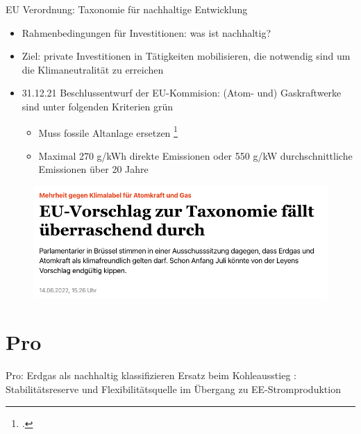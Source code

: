 \documentclass[10pt]{beamer}
\begin{document}
\begin{frame}{EU Verordnung: Taxonomie für nachhaltige Entwicklung}
  \small
  \begin{itemize}
    \item Rahmenbedingungen für Investitionen: was ist nachhaltig? 
    \item Ziel: private Investitionen in Tätigkeiten mobilisieren, die notwendig sind um die Klimaneutralität zu erreichen 
    \item 31.12.21 Beschlussentwurf der EU-Kommision: 
      (Atom- und) Gaskraftwerke sind unter folgenden Kriterien grün 
    \begin{itemize}
      \item Muss fossile Altanlage ersetzen \footcite{taz-taxonomie}
      \item Maximal 270 g/kWh direkte Emissionen oder 550 g/kW durchschnittliche Emissionen über 20 Jahre 
    \end{itemize}
  \end{itemize}
\end{frame}

\begin{frame}
\begin{figure}
\includegraphics[width=\textwidth]{fig/headline-taxonomie.png}

\scriptsize{}
\end{figure}
\end{frame}

\section{Pro}


\begin{frame}{Pro: Erdgas als nachhaltig klassifizieren}
    Ersatz beim Kohleausstieg :
    Stabilitätsreserve und Flexibilitätsquelle im Übergang zu EE-Stromproduktion 
\end{frame}
\end{document}
